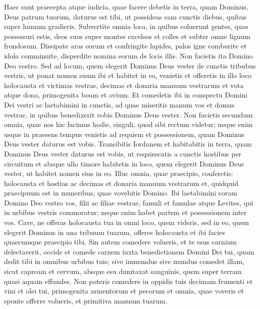 \begin{biblechapter}
\begin{biblechapter}
\begin{biblechapter}
\begin{biblechapter}
\begin{biblechapter}
\begin{biblechapter}
\begin{biblechapter}
\begin{biblechapter}
\begin{biblechapter}
\begin{biblechapter}
\begin{biblechapter}
\begin{biblechapter}
\verse Haec sunt praecepta atque iudicia, quae facere debetis in terra, quam Dominus, Deus patrum tuorum, daturus est tibi, ut possideas eam cunctis diebus, quibus super humum gradieris.
 \verse Subvertite omnia loca, in quibus coluerunt gentes, quas possessuri estis, deos suos super montes excelsos et colles et subter omne lignum frondosum. 
\verse Dissipate aras eorum et confringite lapides, palos igne comburite et idola comminuite, disperdite nomina eorum de locis illis.
 \verse Non facietis ita Domino Deo vestro. 
\verse Sed ad locum, quem elegerit Dominus Deus vester de cunctis tribubus vestris, ut ponat nomen suum ibi et habitet in eo, venietis 
\verse et offeretis in illo loco holocausta et victimas vestras, decimas et donaria manuum vestrarum et vota atque dona, primogenita boum et ovium. 
\verse Et comedetis ibi in conspectu Domini Dei vestri ac laetabimini in cunctis, ad quae miseritis manum vos et domus vestrae, in quibus benedixerit vobis Dominus Deus vester.
 \verse Non facietis secundum omnia, quae nos hic facimus hodie, singuli, quod sibi rectum videtur; 
\verse neque enim usque in praesens tempus venistis ad requiem et possessionem, quam Dominus Deus vester daturus est vobis. 
\verse Transibitis Iordanem et habitabitis in terra, quam Dominus Deus vester daturus est vobis, ut requiescatis a cunctis hostibus per circuitum et absque ullo timore habitetis 
 \verse in loco, quem elegerit Dominus Deus vester, ut habitet nomen eius in eo. Illuc omnia, quae praecipio, conferetis: holocausta et hostias ac decimas et donaria manuum vestrarum et, quidquid praecipuum est in muneribus, quae vovebitis Domino. 
\verse Ibi laetabimini coram Domino Deo vestro vos, filii ac filiae vestrae, famuli et famulae atque Levites, qui in urbibus vestris commoratur; neque enim habet partem et possessionem inter vos.
 \verse Cave, ne offeras holocausta tua in omni loco, quem videris, 
\verse sed in eo, quem elegerit Dominus in una tribuum tuarum, offeres holocausta et ibi facies quaecumque praecipio tibi. 
\verse Sin autem comedere volueris, et te esus carnium delectaverit, occide et comede carnem iuxta benedictionem Domini Dei tui, quam dedit tibi in omnibus urbibus tuis; sive immundus sive mundus comedet illam, sicut capream et cervum, 
\verse absque esu dumtaxat sanguinis, quem super terram quasi aquam effundes. 
\verse Non poteris comedere in oppidis tuis decimam frumenti et vini et olei tui, primogenita armentorum et pecorum et omnia, quae voveris et sponte offerre volueris, et primitiva manuum tuarum. 

\end{biblechapter}
\end{biblechapter}
\end{biblechapter}
\end{biblechapter}
\end{biblechapter}
\end{biblechapter}
\end{biblechapter}
\end{biblechapter}
\end{biblechapter}
\end{biblechapter}
\end{biblechapter}
\end{biblechapter}
